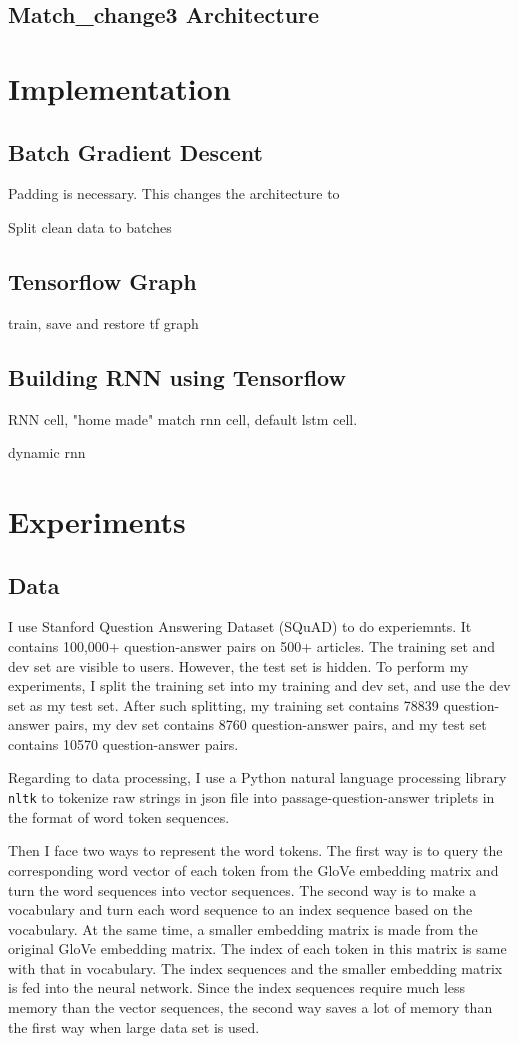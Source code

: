 \documentclass[modernstyle,12pt]{sjsuthesis}
\theoremstyle{definition}
\begin{document}
\section{Match\_change3 Architecture}

\chapter{Implementation}
\section{Batch Gradient Descent}

Padding is necessary. This changes the architecture to

Split clean data to batches

\section{Tensorflow Graph}
train, save and restore tf graph

\section{Building RNN using Tensorflow}
RNN cell, "home made" match rnn cell, default lstm cell.

dynamic rnn
\chapter{Experiments}
\section{Data}
I use Stanford Question Answering Dataset (SQuAD) to do experiemnts.  It contains 100,000+ question-answer pairs on 500+ articles. The training set and dev set are visible to users. However, the test set is hidden. To perform my experiments, I split the training set into my training and dev set, and use the dev set as my test set. After such splitting, my training set contains 78839 question-answer pairs, my dev set contains 8760 question-answer pairs, and my test set contains 10570 question-answer pairs.

 Regarding to data processing, I use a Python natural language processing library {\tt nltk} to tokenize raw strings in json file into passage-question-answer triplets in the format of word token sequences.

Then I face two ways to represent the word tokens. The first way is to query the corresponding word vector of each token from the GloVe embedding matrix and turn the word sequences into vector sequences.  The second way is to make a vocabulary and turn each word sequence to an index sequence based on the vocabulary. At the same time, a smaller embedding matrix is made from the original GloVe embedding matrix. The index of each token in this matrix is same with that in vocabulary. The index sequences and the smaller embedding matrix is fed into the neural network. Since the index sequences require much less memory than the vector sequences, the second way saves a lot of memory than the first way when large data set is used.
\end{document}
